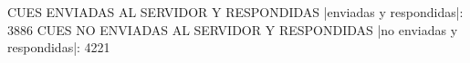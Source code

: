 CUES ENVIADAS AL SERVIDOR Y RESPONDIDAS
|enviadas y respondidas|: 3886
CUES NO ENVIADAS AL SERVIDOR Y RESPONDIDAS
|no enviadas y respondidas|: 4221